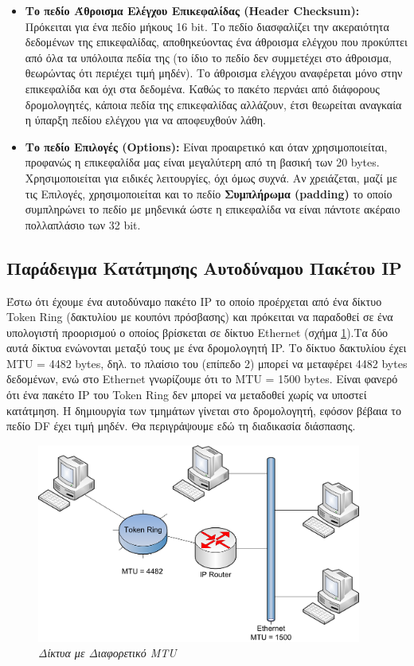 \begin{itemize}
\item \textbf{Το πεδίο Άθροισμα Ελέγχου Επικεφαλίδας (Header Checksum):} Πρόκειται για ένα πεδίο μήκους 16 bit. Το πεδίο διασφαλίζει την ακεραιότητα δεδομένων της επικεφαλίδας, αποθηκεύοντας ένα άθροισμα ελέγχου που προκύπτει από όλα τα υπόλοιπα πεδία της (το ίδιο το πεδίο δεν συμμετέχει στο άθροισμα, θεωρώντας ότι περιέχει τιμή μηδέν). Το άθροισμα ελέγχου αναφέρεται μόνο στην επικεφαλίδα και όχι στα δεδομένα. Καθώς το πακέτο περνάει από διάφορους δρομολογητές, κάποια πεδία της επικεφαλίδας αλλάζουν, έτσι θεωρείται αναγκαία η ύπαρξη πεδίου ελέγχου για να αποφευχθούν λάθη.  

\item \textbf{Το πεδίο Επιλογές (Options):} Είναι προαιρετικό και όταν χρησιμοποιείται, προφανώς η επικεφαλίδα μας είναι μεγαλύτερη από τη βασική των 20 bytes. Χρησιμοποιείται για ειδικές λειτουργίες, όχι όμως συχνά. Αν χρειάζεται, μαζί με τις Επιλογές, χρησιμοποιείται και το πεδίο \textbf{Συμπλήρωμα (padding)} το οποίο συμπληρώνει το πεδίο με μηδενικά ώστε η επικεφαλίδα να είναι πάντοτε ακέραιο πολλαπλάσιο των 32 bit.
\end{itemize} 

\subsection*{Παράδειγμα Κατάτμησης Αυτοδύναμου Πακέτου IP}

Έστω ότι έχουμε ένα αυτοδύναμο πακέτο IP το οποίο προέρχεται από ένα δίκτυο Token Ring (δακτυλίου με κουπόνι πρόσβασης)  και πρόκειται να παραδοθεί σε ένα υπολογιστή προορισμού ο οποίος βρίσκεται σε δίκτυο Ethernet (σχήμα \ref{3-6}).Τα δύο αυτά δίκτυα ενώνονται μεταξύ τους με ένα δρομολογητή IP. Το δίκτυο δακτυλίου έχει MTU = 4482 bytes, δηλ. το πλαίσιο του (επίπεδο 2) μπορεί να μεταφέρει 4482 bytes δεδομένων, ενώ στο Ethernet γνωρίζουμε ότι το MTU = 1500 bytes. Είναι φανερό ότι ένα πακέτο IP του Token Ring δεν μπορεί να μεταδοθεί χωρίς να υποστεί κατάτμηση. Η δημιουργία των τμημάτων γίνεται στο δρομολογητή, εφόσον βέβαια το πεδίο DF έχει τιμή μηδέν. Θα περιγράψουμε εδώ τη διαδικασία διάσπασης.

\begin{figure}[!ht]
  \centering
  \includegraphics[width=0.95\textwidth]{images/chapter3/3-6}
  \caption {\textsl{Δίκτυα με Διαφορετικό MTU}}
  \label{3-6}
\end{figure}


